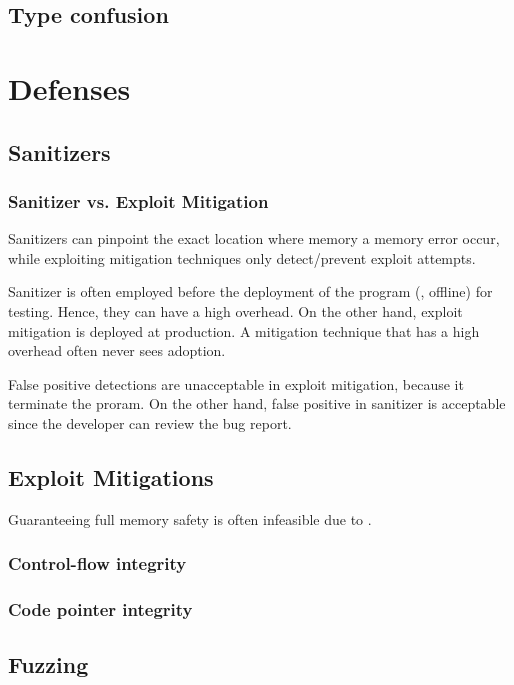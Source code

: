 \documentclass[11pt]{memoir}
\begin{document}
\section{Type confusion}

\chapter{Defenses}



\section{Sanitizers}
\subsection{Sanitizer vs. Exploit Mitigation}
Sanitizers can pinpoint the exact location where memory a memory error occur, while exploiting mitigation techniques only detect/prevent exploit attempts.

Sanitizer is often employed before the deployment of the program (\ie, offline) for testing.
Hence, they can have a high overhead.
On the other hand, exploit mitigation is deployed at production.  
A mitigation technique that has a high overhead often never sees adoption.

False positive detections are unacceptable in exploit mitigation, because it terminate the proram. 
On the other hand, false positive in sanitizer is acceptable since the developer can review the bug report.




\section{Exploit Mitigations}
Guaranteeing full memory safety is often infeasible due to .
\subsection{Control-flow integrity}

\subsection{Code pointer integrity}
\cite{szekeres2013sok}


\section{Fuzzing}
\end{document}
